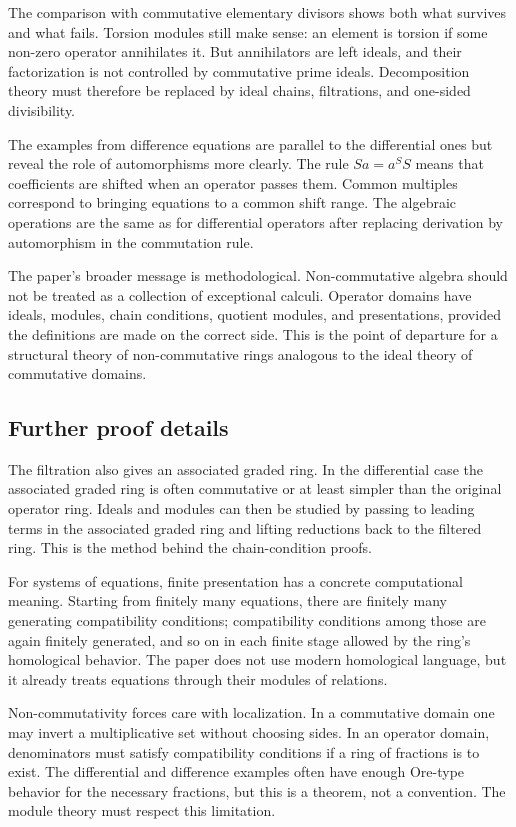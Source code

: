 \documentclass[11pt]{article}
\begin{document}
The comparison with commutative elementary divisors shows both what survives and what fails. Torsion
modules still make sense: an element is torsion if some non-zero operator annihilates it. But
annihilators are left ideals, and their factorization is not controlled by commutative prime ideals.
Decomposition theory must therefore be replaced by ideal chains, filtrations, and one-sided
divisibility.

The examples from difference equations are parallel to the differential ones but reveal the role of
automorphisms more clearly. The rule \(Sa=a^S S\) means that coefficients are shifted when an
operator passes them. Common multiples correspond to bringing equations to a common shift range. The
algebraic operations are the same as for differential operators after replacing derivation by
automorphism in the commutation rule.

The paper's broader message is methodological. Non-commutative algebra should not be treated as a
collection of exceptional calculi. Operator domains have ideals, modules, chain conditions, quotient
modules, and presentations, provided the definitions are made on the correct side. This is the point
of departure for a structural theory of non-commutative rings analogous to the ideal theory of
commutative domains.


\subsection{Further proof details}

The filtration also gives an associated graded ring. In the differential case the associated graded
ring is often commutative or at least simpler than the original operator ring. Ideals and modules
can then be studied by passing to leading terms in the associated graded ring and lifting reductions
back to the filtered ring. This is the method behind the chain-condition proofs.

For systems of equations, finite presentation has a concrete computational meaning. Starting from
finitely many equations, there are finitely many generating compatibility conditions; compatibility
conditions among those are again finitely generated, and so on in each finite stage allowed by the
ring's homological behavior. The paper does not use modern homological language, but it already
treats equations through their modules of relations.

Non-commutativity forces care with localization. In a commutative domain one may invert a
multiplicative set without choosing sides. In an operator domain, denominators must satisfy
compatibility conditions if a ring of fractions is to exist. The differential and difference
examples often have enough Ore-type behavior for the necessary fractions, but this is a theorem, not
a convention. The module theory must respect this limitation.
\clearpage
\end{document}
